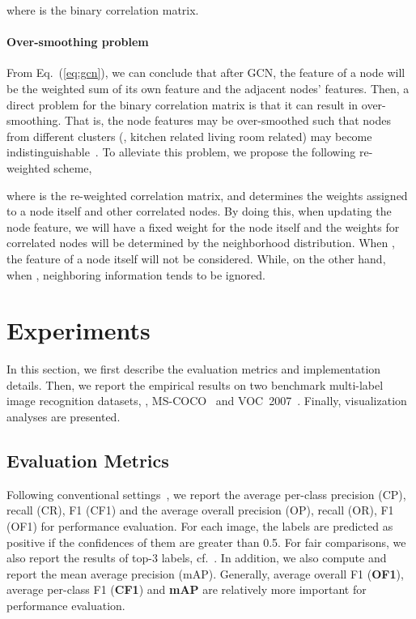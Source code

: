\documentclass[10pt,twocolumn,letterpaper]{article}
\begin{document}
where  is the binary correlation matrix.

\paragraph{Over-smoothing problem} From Eq.~(\ref{eq:gcn}), we can conclude that after GCN, the feature of a node will be the weighted sum of its own feature and the adjacent nodes' features. Then, a direct problem for the binary correlation matrix is that it can result in over-smoothing. That is, the node features may be over-smoothed such that nodes from different clusters (\eg, kitchen related \vs living room related) may become indistinguishable~\cite{oversmooth}. To alleviate this problem, we propose the following re-weighted scheme,

where  is the re-weighted correlation matrix, and  determines the weights assigned to a node itself and other correlated nodes. By doing this, when updating the node feature, we will have a fixed weight for the node itself and the weights for correlated nodes will be determined by the neighborhood distribution. When , the feature of a node itself will not be considered. While, on the other hand, when , neighboring information tends to be ignored.

\section{Experiments}

In this section, we first describe the evaluation metrics and implementation details. Then, we report the empirical results on two benchmark multi-label image recognition datasets, \ie, {MS-COCO}~\cite{coco} and {VOC}~2007~\cite{voc}. Finally, visualization analyses are presented.

\subsection{Evaluation Metrics}

Following conventional settings~\cite{cnn-rnn,multi_evidence,srn}, we report the average per-class precision (CP), recall (CR), F1 (CF1) and the average overall precision (OP), recall (OR), F1 (OF1) for performance evaluation. For each image, the labels are predicted as positive if the confidences of them are greater than 0.5. For fair comparisons, we also report the results of top-3 labels, cf.~\cite{srn,multi_evidence}. In addition, we also compute and report the mean average precision (mAP). Generally, average overall F1 (\textbf{OF1}), average per-class F1 (\textbf{CF1}) and \textbf{mAP} are relatively more important for performance evaluation.
\end{document}
